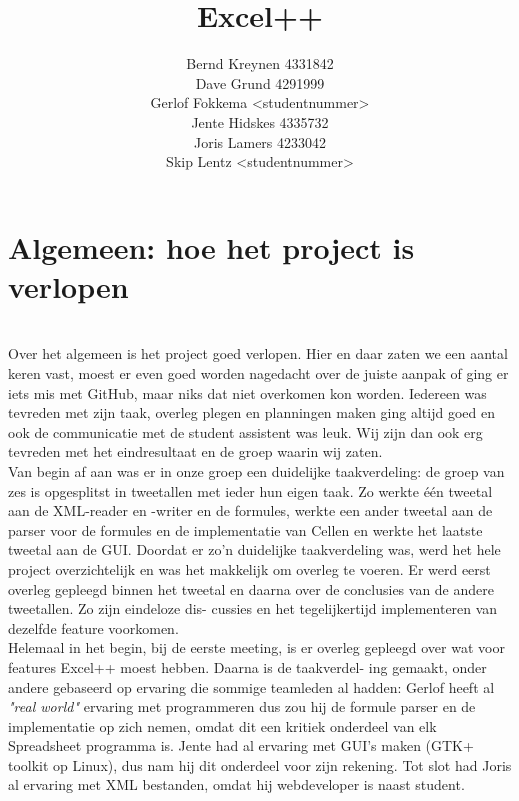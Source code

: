 \documentclass[a4paper,11pt]{article}
\title{Excel++}
\author{Bernd Kreynen 4331842\\
		Dave Grund 4291999\\
		Gerlof Fokkema <studentnummer>\\
		Jente Hidskes 4335732\\
		Joris Lamers 4233042\\
		Skip Lentz <studentnummer>\\
	   }
\begin{document}
\begin{titlepage}
\maketitle
\thispagestyle{empty} %
\end{titlepage}

\newpage\section{Algemeen: hoe het project is verlopen}\mbox{} \\
Over het algemeen is het project goed verlopen. Hier en daar zaten we
een aantal keren vast, moest er even goed worden nagedacht over de juiste
aanpak of ging er iets mis met GitHub, maar niks dat niet overkomen kon
worden. Iedereen was tevreden met zijn taak, overleg plegen en planningen
maken ging altijd goed en ook de communicatie met de student assistent
was leuk. Wij zijn dan ook erg tevreden met het eindresultaat en de groep
waarin wij zaten.\\

Van begin af aan was er in onze groep een duidelijke taakverdeling: de
groep van zes is opgesplitst in tweetallen met ieder hun eigen taak. Zo
werkte één tweetal aan de XML-reader en -writer en de formules, werkte
een ander tweetal aan de parser voor de formules en de implementatie van
Cellen en werkte het laatste tweetal aan de GUI. Doordat er zo’n duidelijke
taakverdeling was, werd het hele project overzichtelijk en was het makkelijk
om overleg te voeren. Er werd eerst overleg gepleegd binnen het tweetal en
daarna over de conclusies van de andere tweetallen. Zo zijn eindeloze dis-
cussies en het tegelijkertijd implementeren van dezelfde feature voorkomen.\\

Helemaal in het begin, bij de eerste meeting, is er overleg gepleegd
over wat voor features Excel++ moest hebben. Daarna is de taakverdel-
ing gemaakt, onder andere gebaseerd op ervaring die sommige teamleden al
hadden: Gerlof heeft al \textit{"real world"} ervaring met programmeren dus zou
hij de formule parser en de implementatie op zich nemen, omdat dit een
kritiek onderdeel van elk Spreadsheet programma is. Jente had al ervaring
met GUI’s maken (GTK+ toolkit op Linux), dus nam hij dit onderdeel voor
zijn rekening. Tot slot had Joris al ervaring met XML bestanden, omdat hij
webdeveloper is naast student.\\
\end{document}
